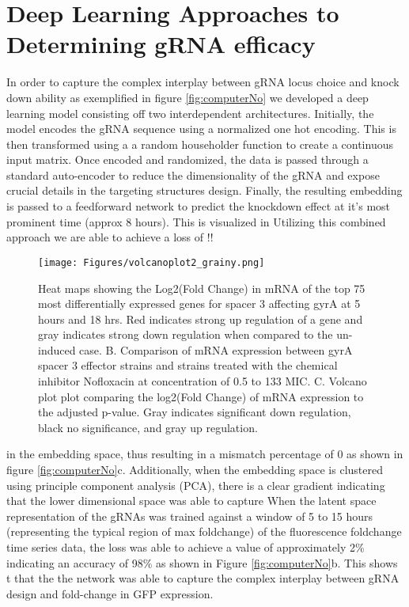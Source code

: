 \documentclass[times]{zHenriquesLab-StyleBioRxiv}
\begin{document}
\section*{Deep Learning Approaches to Determining gRNA efficacy}
In order to capture the complex interplay between gRNA locus choice and knock down ability as exemplified in figure \ref{fig:computerNo}
we developed a deep learning model consisting off two interdependent architectures. Initially, the model encodes the gRNA sequence using a normalized one hot encoding. This is then transformed using a a random householder function to create a continuous input matrix. Once encoded and randomized, the data is passed through a standard auto-encoder to reduce the dimensionality of the gRNA and expose crucial details in the targeting structures design. Finally, the resulting embedding is passed to a feedforward network to predict the knockdown effect at it's most prominent time (approx 8 hours). This is visualized in  Utilizing this combined approach we are able to achieve a loss of !!

\begin{figure*}[t]
    \centering
    \texttt{[image: Figures/volcanoplot2\_grainy.png]}
    \caption{Heat maps showing the Log2(Fold Change) in mRNA of the top 75 most differentially expressed genes for spacer 3 affecting gyrA at 5 hours and 18 hrs. Red indicates strong up regulation of a gene and gray indicates strong down regulation when compared to the un-induced case. B. Comparison of mRNA expression between gyrA spacer 3 effector strains and strains treated with the chemical inhibitor Nofloxacin at concentration of 0.5 to 133 MIC. C. Volcano plot plot comparing the log2(Fold Change) of mRNA expression to the adjusted p-value. Gray indicates significant down regulation, black no significance, and gray up regulation.}
    \label{fig:volcano}
\end{figure*}

in the embedding space, thus resulting in a mismatch percentage of 0 as shown in figure \ref{fig:computerNo}c. Additionally, when the embedding space is clustered using principle component analysis (PCA), there is a clear gradient indicating that the lower dimensional space was able to capture  When the latent space representation of the gRNAs was trained against a window of 5 to 15 hours (representing the typical region of max foldchange) of the fluorescence foldchange time series data, the loss was able to achieve a value of approximately 2\% indicating an accuracy of 98\% as shown in Figure \ref{fig:computerNo}b. This shows t that the the network was able to capture the complex interplay between gRNA design and fold-change in GFP expression.
\end{document}

